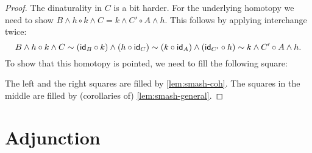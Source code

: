 \documentclass{article}
\newcommand{\smsh}{\wedge}
\renewcommand{\o}{\ensuremath{\circ}}
\begin{document}
\begin{proof}
The dinaturality in $C$ is a bit harder. For the underlying homotopy we need to show
$B\smsh h\o k\smsh C=k\smsh C'\o A\smsh h$. This follows by applying interchange twice:
$$B\smsh h\o k\smsh C\sim(\idfunc[B]\o k)\smsh(h\o\idfunc[C])\sim(k\o\idfunc[A])\smsh(\idfunc[C']\o h)\sim k\smsh C'\o A\smsh h.$$
To show that this homotopy is pointed, we need to fill the following square:
\begin{center}
\end{center}
The left and the right squares are filled by \autoref{lem:smash-coh}. The squares in the middle
are filled by (corollaries of) \autoref{lem:smash-general}.
\end{proof}

\section{Adjunction}
\end{document}
